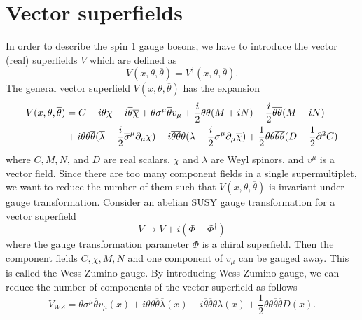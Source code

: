\documentclass[12pt]{report}
\begin{document}
\section{Vector superfields}
In order to describe the spin 1 gauge bosons, we have to introduce the vector (real) superfields $V$ which are defined as
\begin{equation}
V(x, \theta, \overline{\theta}) = V^{\dag} (x, \theta, \overline{\theta}) .
\end{equation}
The general vector superfield $V(x, \theta, \overline{\theta})$ has the expansion
\begin{align}
V(x, \theta, \overline{\theta}) &= C + i \theta \chi - i \overline{\theta} \overline{\chi} + \theta \sigma^{\mu} \overline{\theta} v_{\mu} + \frac{i}{2} \theta \theta (M + iN) - \frac{i}{2} \overline{\theta} \overline{\theta} (M - iN) \notag \\
& + i \theta \theta \overline{\theta} (\overline{\lambda} + \frac{i}{2} \overline{\sigma}^{\mu} \partial_{\mu} \chi ) - i \overline{\theta} \overline{\theta} \theta (\lambda - \frac{i}{2} \sigma^{\mu} \partial_{\mu} \overline{\chi}) + \frac{1}{2} \theta \theta \overline{\theta} \overline{\theta} (D - \frac{1}{2} \partial^{2} C)
\end{align}
where $C, M, N$, and $D$ are real scalars, $\chi$ and $\lambda$ are Weyl spinors, and $v^{\mu}$ is a vector field.
Since there are too many component fields in a single supermultiplet, we want to reduce the number of them such that $V(x, \theta, \overline{\theta})$ is invariant under gauge transformation.
Consider an abelian SUSY gauge transformation for a vector superfield
\begin{equation}
V \to V + i (\Phi - \Phi^{\dag})
\end{equation}
where the gauge transformation parameter $\Phi$ is a chiral superfield. Then the component fields $C, \chi, M, N$ and one component of $v_{\mu}$ can be gauged away.
This is called the Wess-Zumino gauge.
By introducing Wess-Zumino gauge, we can reduce the number of components of the vector superfield as follows
\begin{equation} \label{eq: WZ gauge vector superfield}
V_{WZ} = \theta \sigma^{\mu} \overline{\theta} v_{\mu}(x) + i \theta \theta \overline{\theta} \overline{\lambda}(x) - i \overline{\theta} \overline{\theta} \theta \lambda(x) + \frac{1}{2} \theta \theta \overline{\theta} \overline{\theta} D(x) .
\end{equation}
\end{document}
